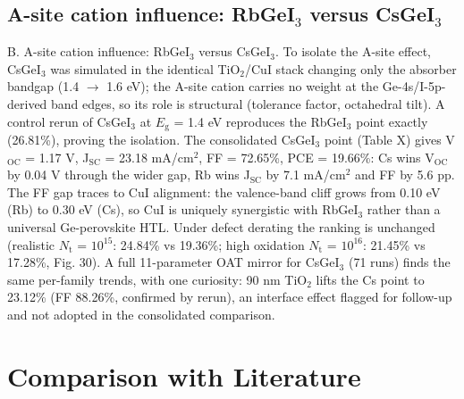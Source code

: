 \documentclass[review]{elsarticle}
\begin{document}
\subsection{A-site cation influence: RbGeI$_{3}$ versus CsGeI$_{3}$}
B. A-site cation influence: RbGeI$_{3}$ versus CsGeI$_{3}$. To isolate the A-site effect, CsGeI$_{3}$ was simulated in the identical TiO$_{2}$/CuI stack changing only the absorber bandgap (1.4 $\rightarrow$ 1.6 eV); the A-site cation carries no weight at the Ge-4s/I-5p-derived band edges, so its role is structural (tolerance factor, octahedral tilt). A control rerun of CsGeI$_{3}$ at $E_{\mathrm{g}}$ = 1.4 eV reproduces the RbGeI$_{3}$ point exactly (26.81\%), proving the isolation. The consolidated CsGeI$_{3}$ point (Table X) gives V$_{\mathrm{OC}}$ = 1.17 V, J$_{\mathrm{SC}}$ = 23.18 mA/cm$^{2}$, FF = 72.65\%, PCE = 19.66\%: Cs wins V$_{\mathrm{OC}}$ by 0.04 V through the wider gap, Rb wins J$_{\mathrm{SC}}$ by 7.1 mA/cm$^{2}$ and FF by 5.6 pp. The FF gap traces to CuI alignment: the valence-band cliff grows from 0.10 eV (Rb) to 0.30 eV (Cs), so CuI is uniquely synergistic with RbGeI$_{3}$ rather than a universal Ge-perovskite HTL. Under defect derating the ranking is unchanged (realistic $N_{\mathrm{t}}$ = $10^{15}$: 24.84\% vs 19.36\%; high oxidation $N_{\mathrm{t}}$ = $10^{16}$: 21.45\% vs 17.28\%, Fig. 30). A full 11-parameter OAT mirror for CsGeI$_{3}$ (71 runs) finds the same per-family trends, with one curiosity: 90 nm TiO$_{2}$ lifts the Cs point to 23.12\% (FF 88.26\%, confirmed by rerun), an interface effect flagged for follow-up and not adopted in the consolidated comparison.

\section{Comparison with Literature}
\end{document}
